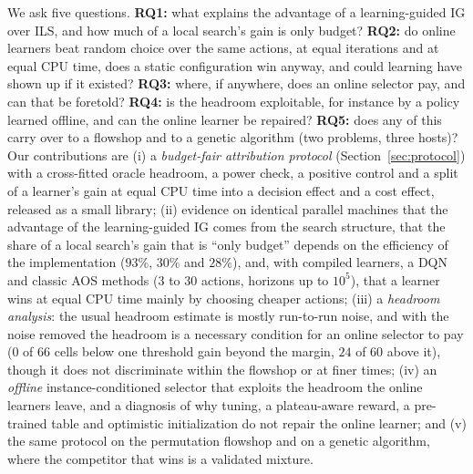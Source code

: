 \documentclass[conference,a4paper]{IEEEtran}
\begin{document}
We ask five questions. \textbf{RQ1:} what explains the advantage of a learning-guided IG over ILS, and how much of a local search's gain is only budget? \textbf{RQ2:} do online learners beat random choice over the same actions, at equal iterations and at equal CPU time, does a static configuration win anyway, and could learning have shown up if it existed?
\textbf{RQ3:} where, if anywhere, does an online selector pay, and can that be foretold? \textbf{RQ4:} is the headroom exploitable, for instance by a policy learned offline, and can the online learner be repaired?
\textbf{RQ5:} does any of this carry over to a flowshop and to a genetic algorithm (two problems, three hosts)? Our contributions are
(i) a \emph{budget-fair attribution protocol} (Section~\ref{sec:protocol}) with a cross-fitted oracle headroom, a power check, a positive control and a split of a learner's gain at equal CPU time into a decision effect and a cost effect, released as a small library;
(ii) evidence on identical parallel machines that the advantage of the learning-guided IG comes from the search structure, that the share of a local search's gain that is ``only budget'' depends on the efficiency of the implementation ($93\%$, $30\%$ and $28\%$), and, with compiled learners, a DQN and classic AOS methods ($3$ to $30$ actions, horizons up to $10^5$), that a learner wins at equal CPU time mainly by choosing cheaper actions;
(iii) a \emph{headroom analysis}: the usual headroom estimate is mostly run-to-run noise, and with the noise removed the headroom is a necessary condition for an online selector to pay ($0$ of $66$ cells below one threshold gain beyond the margin, $24$ of $60$ above it), though it does not discriminate within the flowshop or at finer times;
(iv) an \emph{offline} instance-conditioned selector that exploits the headroom the online learners leave, and a diagnosis of why tuning, a plateau-aware reward, a pre-trained table and optimistic initialization do not repair the online learner; and (v) the same protocol on the permutation flowshop and on a genetic algorithm, where the competitor that wins is a validated mixture.
\end{document}
